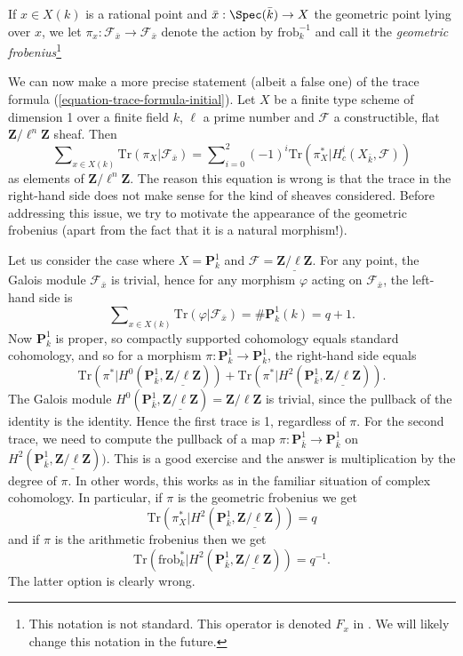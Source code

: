\begin{definition}
\label{definition-geometric-frobenius-on-stalk}
If $x \in X(k)$ is a rational point and $\bar x : \Spec(\bar k) \to X$
the geometric point lying over $x$, we let $\pi_x : \mathcal{F}_{\bar x} \to
\mathcal{F}_{\bar x}$ denote the action by $\text{frob}_k^{-1}$ and call it the
{\it geometric frobenius}\footnote{This notation is not standard.
This operator is denoted $F_x$ in \cite{SGA4.5}. We will likely change
this notation in the future.}
\end{definition}

\noindent
We can now make a more precise statement (albeit a false one) of the trace
formula (\ref{equation-trace-formula-initial}). Let $X$ be a finite
type scheme of dimension 1
over a finite field $k$, $\ell$ a prime number and $\mathcal{F}$ a
constructible, flat $\mathbf{Z}/\ell^n\mathbf{Z}$ sheaf. Then
\begin{equation}
\label{equation-trace-formula-second}
\sum\nolimits_{x \in X(k)}
\text{Tr}(\pi_X | \mathcal{F}_{\bar x})
=
\sum\nolimits_{i=0}^2
(-1)^i \text{Tr}(\pi_X^* | H^i_c(X_{\bar k}, \mathcal{F}))
\end{equation}
as elements of $\mathbf{Z}/\ell^n\mathbf{Z}$. The reason this equation is wrong
is that the trace in the right-hand side does not make sense for the kind of
sheaves considered. Before addressing this issue, we try to motivate the
appearance of the geometric frobenius (apart from the fact that it is a natural
morphism!).

\medskip\noindent
Let us consider the case where $X = \mathbf{P}^1_k$ and $\mathcal{F} =
\underline{\mathbf{Z}/\ell\mathbf{Z}}$. For any point, the Galois module
$\mathcal{F}_{\bar x}$ is trivial, hence for any morphism $\varphi$ acting on
$\mathcal{F}_{\bar x}$, the left-hand side is
$$
\sum\nolimits_{x \in X(k)} \text{Tr}(\varphi | \mathcal{F}_{\bar x}) =
\#\mathbf{P}^1_k(k) = q+1.
$$
Now $\mathbf{P}^1_k$ is proper, so compactly supported cohomology equals
standard cohomology, and so for a morphism $\pi : \mathbf{P}^1_k \to
\mathbf{P}^1_k$, the right-hand side equals
$$
\text{Tr}(\pi^* | H^0 (\mathbf{P}^1_{\bar k},
\underline{\mathbf{Z}/\ell\mathbf{Z}})) + \text{Tr}(\pi^* | H^2
(\mathbf{P}^1_{\bar k}, \underline{\mathbf{Z}/\ell\mathbf{Z}})).
$$
The Galois module $H^0 (\mathbf{P}^1_{\bar k},
\underline{\mathbf{Z}/\ell\mathbf{Z}}) = \mathbf{Z}/\ell\mathbf{Z}$ is trivial,
since the pullback of the identity is the identity. Hence the first trace is 1,
regardless of $\pi$. For the second trace, we need to compute the pullback of a
map $\pi: \mathbf{P}^1_{\bar k} \to \mathbf{P}^1_{\bar k}$ on $H^2
(\mathbf{P}^1_{\bar k}, \underline{\mathbf{Z}/\ell\mathbf{Z}}))$. This is a
good exercise and the answer is multiplication by the degree of $\pi$. In other
words, this works as in the familiar situation of complex cohomology. In
particular, if $\pi$ is the geometric frobenius we get
$$
\text{Tr}(\pi_X^* | H^2 (\mathbf{P}^1_{\bar k},
\underline{\mathbf{Z}/\ell\mathbf{Z}})) = q
$$
and if $\pi$ is the arithmetic frobenius then we get
$$
\text{Tr}(\text{frob}_k^* | H^2 (\mathbf{P}^1_{\bar k},
\underline{\mathbf{Z}/\ell\mathbf{Z}})) = q^{-1}.
$$
The latter option is clearly wrong.

